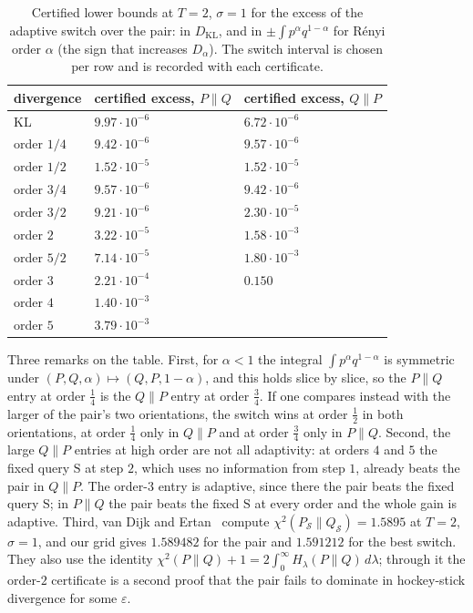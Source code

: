 \documentclass[11pt]{amsart}
\theoremstyle{definition}
\theoremstyle{remark}
\newcommand{\SAME}{\mathrm{S}}
\begin{document}
\begin{table}[ht]
\centering
\begin{tabular}{lll}
\toprule
divergence & certified excess, $P\|Q$ & certified excess, $Q\|P$\\
\midrule
KL & $9.97\cdot10^{-6}$ & $6.72\cdot10^{-6}$\\
order $1/4$ & $9.42\cdot10^{-6}$ & $9.57\cdot10^{-6}$\\
order $1/2$ & $1.52\cdot10^{-5}$ & $1.52\cdot10^{-5}$\\
order $3/4$ & $9.57\cdot10^{-6}$ & $9.42\cdot10^{-6}$\\
order $3/2$ & $9.21\cdot10^{-6}$ & $2.30\cdot10^{-5}$\\
order $2$ & $3.22\cdot10^{-5}$ & $1.58\cdot10^{-3}$\\
order $5/2$ & $7.14\cdot10^{-5}$ & $1.80\cdot10^{-3}$\\
order $3$ & $2.21\cdot10^{-4}$ & $0.150$\\
order $4$ & $1.40\cdot10^{-3}$ & \\
order $5$ & $3.79\cdot10^{-3}$ & \\
\bottomrule
\end{tabular}
\medskip
\caption{Certified lower bounds at $T=2$, $\sigma=1$ for the excess of the adaptive switch over the pair: in $D_{\mathrm{KL}}$, and in $\pm\int p^\alpha q^{1-\alpha}$ for R\'enyi order $\alpha$ (the sign that increases $D_\alpha$). The switch interval is chosen per row and is recorded with each certificate.}
\label{tab:renyi}
\end{table}

Three remarks on the table. First, for $\alpha<1$ the integral $\int p^\alpha q^{1-\alpha}$ is symmetric under $(P,Q,\alpha)\mapsto(Q,P,1-\alpha)$, and this holds slice by slice, so the $P\|Q$ entry at order $\frac14$ is the $Q\|P$ entry at order $\frac34$. If one compares instead with the larger of the pair's two orientations, the switch wins at order $\frac12$ in both orientations, at order $\frac14$ only in $Q\|P$ and at order $\frac34$ only in $P\|Q$. Second, the large $Q\|P$ entries at high order are not all adaptivity: at orders $4$ and $5$ the fixed query $\SAME$ at step $2$, which uses no information from step $1$, already beats the pair in $Q\|P$. The order-$3$ entry is adaptive, since there the pair beats the fixed query $\SAME$; in $P\|Q$ the pair beats the fixed $\SAME$ at every order and the whole gain is adaptive. Third, van Dijk and Ertan~\cite[Appendix~J]{vDE26} compute $\chi^2(P_{\mathcal S}\|Q_{\mathcal S})=1.5895$ at $T=2$, $\sigma=1$, and our grid gives $1.589482$ for the pair and $1.591212$ for the best switch. They also use the identity $\chi^2(P\|Q)+1=2\int_0^\infty H_\lambda(P\|Q)\,d\lambda$; through it the order-$2$ certificate is a second proof that the pair fails to dominate in hockey-stick divergence for some $\varepsilon$.
\end{document}
